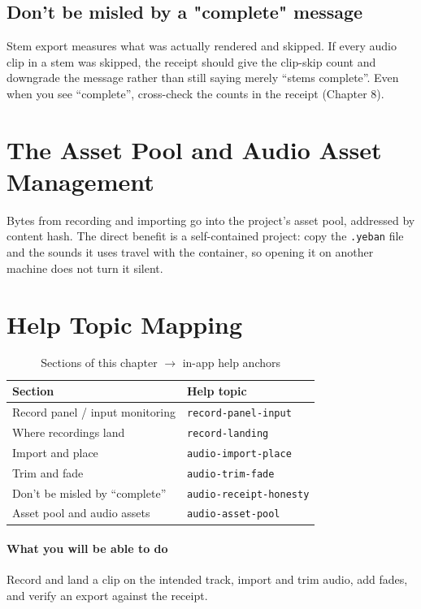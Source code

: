 \subsection{Don't be misled by a "complete" message}

Stem export measures what was actually rendered and skipped. If every audio clip in a
stem was skipped, the receipt should give the clip-skip count and downgrade the
message rather than still saying merely ``stems complete''. Even when you see
``complete'', cross-check the counts in the receipt (Chapter 8).

\section{The Asset Pool and Audio Asset Management}

Bytes from recording and importing go into the project's asset pool, addressed by
content hash. The direct benefit is a self-contained project: copy the \texttt{.yeban}
file and the sounds it uses travel with the container, so opening it on another
machine does not turn it silent.


\section{Help Topic Mapping}

\begin{table}[htbp]
\centering
\caption{Sections of this chapter $\to$ in-app help anchors}
\label{tab:ch05-help}
\begin{tabular}{ll}
\hline
Section & Help topic \\
\hline
Record panel / input monitoring & \texttt{record-panel-input} \\
Where recordings land & \texttt{record-landing} \\
Import and place & \texttt{audio-import-place} \\
Trim and fade & \texttt{audio-trim-fade} \\
Don't be misled by ``complete'' & \texttt{audio-receipt-honesty} \\
Asset pool and audio assets & \texttt{audio-asset-pool} \\
\hline
\end{tabular}
\end{table}

\paragraph{What you will be able to do} Record and land a clip on the intended track, import and trim audio, add fades, and verify an export against the receipt.

